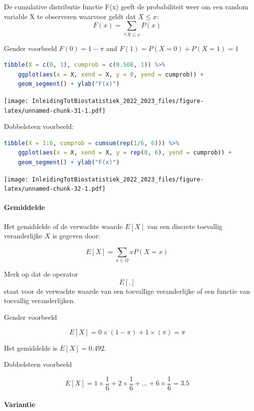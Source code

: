 \documentclass[
  12pt,dutch,coursenotes]{book}
\begin{document}
De cumulative distributie functie F(x) geeft de probabiliteit weer om een random variable X te observeren waarvoor geldt dat \(X\leq x\):
\[ F(x) = \sum\limits_{\forall X\leq x} P(x)\]

Gender voorbeeld \(F(0)=1-\pi\) and \(F(1)= P(X=0) + P(X=1)=1\)

\begin{lstlisting}[language=R]
tibble(X = c(0, 1), cumprob = c(0.508, 1)) %>%
    ggplot(aes(x = X, xend = X, y = 0, yend = cumprob)) +
    geom_segment() + ylab("F(x)")
\end{lstlisting}

\texttt{[image: InleidingTotBiostatistiek\_2022\_2023\_files/figure-latex/unnamed-chunk-31-1.pdf]}

Dobbelsteen voorbeeld:

\begin{lstlisting}[language=R]
tibble(X = 1:6, cumprob = cumsum(rep(1/6, 6))) %>%
    ggplot(aes(x = X, xend = X, y = rep(0, 6), yend = cumprob)) +
    geom_segment() + ylab("F(x)")
\end{lstlisting}

\texttt{[image: InleidingTotBiostatistiek\_2022\_2023\_files/figure-latex/unnamed-chunk-32-1.pdf]}

\hypertarget{gemiddelde}{%
\paragraph{Gemiddelde}\label{gemiddelde}}

Het gemiddelde of de verwachte waarde \(E[X]\) van een discrete toevallig veranderlijke \(X\) is gegeven door:

\[E[X]=\sum\limits_{x\in\Omega} x P(X=x)\]

Merk op dat de operator \[E[.]\] staat voor de verwachte waarde van een toevallige veranderlijke of een functie van toevallig veranderlijken.

Gender voorbeeld

\[E[X]= 0 \times (1-\pi) + 1 \times (\pi) = \pi\]

Het gemiddelde is \(E[X]=0.492\).

Dobbelsteen voorbeeld

\[E[X]= 1 \times \frac{1}{6} + 2 \times \frac{1}{6} + \ldots + 6 \times \frac{1}{6} = 3.5\]

\hypertarget{variantie}{%
\paragraph{Variantie}\label{variantie}}
\end{document}

